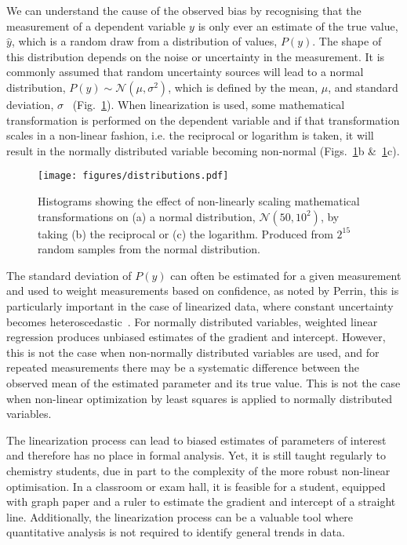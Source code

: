 \documentclass[journal=jacsat,manuscript=article]{achemso}
\begin{document}
We can understand the cause of the observed bias by recognising that the measurement of a dependent variable $y$ is only ever an estimate of the true value, $\hat{y}$, which is a random draw from a distribution of values, $P(y)$. 
The shape of this distribution depends on the noise or uncertainty in the measurement. 
It is commonly assumed that random uncertainty sources will lead to a normal distribution, $P(y) \sim \mathcal{N}(\mu, \sigma^2)$, which is defined by the mean, $\mu$, and standard deviation, $\sigma$~\cite{monk_math_2010} (Fig.~\ref{fig:distributions}).
When linearization is used, some mathematical transformation is performed on the dependent variable and if that transformation scales in a non-linear fashion, i.e. the reciprocal or logarithm is taken, it will result in the normally distributed variable becoming non-normal (Figs.~\ref{fig:distributions}b \&~\ref{fig:distributions}c).
%
\begin{figure}
  \texttt{[image: figures/distributions.pdf]}
  \caption{
    Histograms showing the effect of non-linearly scaling mathematical transformations on (a) a normal distribution, $\mathcal{N}(50, 10^2)$, by taking (b) the reciprocal or (c) the logarithm. 
    Produced from $2^{15}$ random samples from the normal distribution.
    }
  \label{fig:distributions}
\end{figure}
%

The standard deviation of $P(y)$ can often be estimated for a given measurement and used to weight measurements based on confidence, as noted by Perrin, this is particularly important in the case of linearized data, where constant uncertainty becomes heteroscedastic~\cite{perrin_linear_2017}.
For normally distributed variables, weighted linear regression produces unbiased estimates of the gradient and intercept. 
However, this is not the case when non-normally distributed variables are used, and for repeated measurements there may be a systematic difference between the observed mean of the estimated parameter and its true value.
This is not the case when non-linear optimization by least squares is applied to normally distributed variables. 

The linearization process can lead to biased estimates of parameters of interest and therefore has no place in formal analysis. 
Yet, it is still taught regularly to chemistry students, due in part to the complexity of the more robust non-linear optimisation. 
In a classroom or exam hall, it is feasible for a student, equipped with graph paper and a ruler to estimate the gradient and intercept of a straight line. 
Additionally, the linearization process can be a valuable tool where quantitative analysis is not required to identify general trends in data. 
\end{document}
